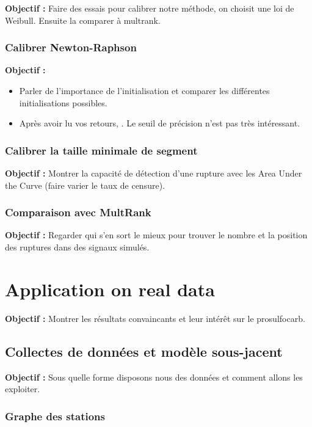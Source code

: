 \documentclass[12pt, twoside]{report}
\begin{document}
\textbf{Objectif :} Faire des essais pour calibrer notre méthode, on choisit une loi de Weibull. Ensuite la comparer à multrank.

\subsection{Calibrer Newton-Raphson}

\textbf{Objectif :}
\begin{itemize}
\item Parler de l'importance de l'initialisation et comparer les différentes initialisations possibles.
\item Après avoir lu vos retours, . Le seuil de précision n'est pas très intéressant.  
\end{itemize}

\subsection{Calibrer la taille minimale de segment}

\textbf{Objectif :} Montrer la capacité de détection d'une rupture avec les Area Under the Curve (faire varier le taux de censure).

\subsection{Comparaison avec MultRank}

\textbf{Objectif :} Regarder qui s'en sort le mieux pour trouver le nombre et la position des ruptures dans des signaux simulés.  

\chapter{Application on real data}

\textbf{Objectif :} Montrer les résultats convaincants et leur intérêt sur le prosulfocarb.  

\section{Collectes de données et modèle sous-jacent}

\textbf{Objectif :} Sous quelle forme disposons nous des données et comment allons les exploiter.

\subsection{Graphe des stations}
\end{document}
